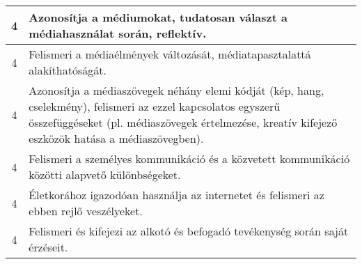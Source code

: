 \begin{longtable}{c | p{12cm} }
                                
                                          4 &  Azonosítja a médiumokat, tudatosan választ a médiahasználat során, reflektív. \\ \hline
                                          4 &  Felismeri a médiaélmények változását, médiatapasztalattá alakíthatóságát. \\ \hline
                                          4 &  Azonosítja a médiaszövegek néhány elemi kódját (kép, hang, cselekmény), felismeri az ezzel kapcsolatos egyszerű összefüggéseket (pl. médiaszövegek értelmezése, kreatív kifejező eszközök hatása a médiaszövegben). \\ \hline
                                          4 &  Felismeri a személyes kommunikáció és a közvetett kommunikáció közötti alapvető különbségeket. \\ \hline
                                          4 &  Életkorához igazodóan használja az internetet és felismeri az ebben rejlő veszélyeket. \\ \hline
                                          4 &  Felismeri és kifejezi az alkotó és befogadó tevékenység során saját érzéseit. \\ \hline
                                      
                        \end{longtable}
            \clearpage

